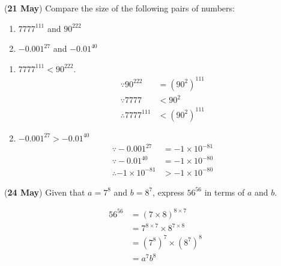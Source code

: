 \documentclass[12pt, answers]{exam} %
\begin{document}
\begin{questions}
	\question (\textbf{21 May}) Compare the size of the following pairs of numbers:
	\begin{enumerate}
	    \item \(7777^{111}\) and \(90^{222}\)
	    \item \(-0.001^{27}\) and \(-0.01^{40}\)
	\end{enumerate}
	
	\begin{solution}
	\begin{enumerate}
	    \item \(7777^{111} < 90^{222}\).
	    \begin{align*}
	        \because 90^{222} &= {\left(90^{2}\right)}^{111} \\
	        \because 7777 &< 90^2 \\
	        \therefore 7777^{111} &< \left(90^2\right)^{111}
	    \end{align*}
	    
	    \item \(-{0.001}^{27} > -{0.01}^{40}\)
	    \begin{align*}
	        \because -0.001^{27} &= -1 \times 10^{-81} \\
	        \because -0.01^{40} &= -1 \times 10^{-80} \\
	        \therefore -1 \times 10^{-81} &> -1 \times 10^{-80}
	    \end{align*}
	\end{enumerate}
	\end{solution}
	
	\question (\textbf{24 May}) Given that \(a = 7^8\) and \(b = 8^7\), express \(56^{56}\) in terms of \(a\) and \(b\).
	\begin{solution}
	\begin{align*}
	    56^{56} &= \left(7 \times 8\right)^{8 \times 7} \\
	    &= 7^{8 \times 7} \times 8^{7 \times 8} \\
	    &= \left(7^8\right)^7 \times \left(8^7\right)^8 \\
	    &= a^7b^8
	\end{align*}
	\end{solution}
\end{questions}
\end{document}
